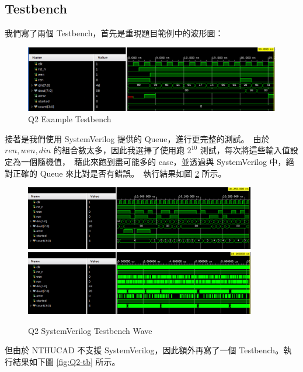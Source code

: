 \documentclass[10.5pt,compsoc,UTF8]{CjC}
\theoremstyle{mystyle}
\begin{document}
\subsection{Testbench}
我們寫了兩個 Testbench，首先是重現題目範例中的波形圖：

\begin{figure}[!h]
  \centering
  \includegraphics[width=\textwidth]{./img/Q2-tb-ex.png}
  \caption{Q2 Example Testbench}
  \label{fig:Q2-tb-ex}
\end{figure}

\newpage

接著是我們使用 SystemVerilog 提供的 Queue，進行更完整的測試。\
由於 $ren, wen, din$ 的組合數太多，因此我選擇了使用跑 $2^{10}$ 測試，每次將這些輸入值設定為一個隨機值，\
藉此來跑到盡可能多的 case，並透過與 SystemVerilog 中，絕對正確的 Queue 來比對是否有錯誤。\
執行結果如圖 \ref{fig:Q2-tb-sv} 所示。

\begin{figure}[!h]
  \centering
  \includegraphics[width=0.9\textwidth]{./img/Q2-tb-sv-wave1.png}
  \includegraphics[width=0.9\textwidth]{./img/Q2-tb-sv-wave2.png}
  \caption{Q2 SystemVerilog Testbench Wave}
  \label{fig:Q2-tb-sv}
\end{figure}

但由於 NTHUCAD 不支援 SystemVerilog，因此額外再寫了一個 Testbench。執行結果如下圖 \ref{fig:Q2-tb} 所示。
\end{document}
